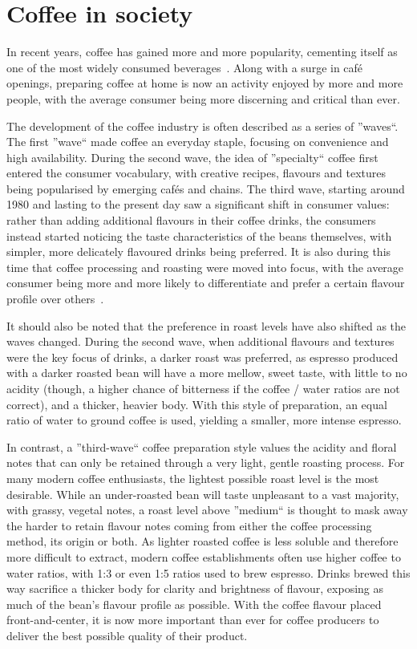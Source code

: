 \section{Coffee in society}
\label{sec:coffee-in-society} In recent years, coffee has gained more and more popularity,
cementing itself as one of the most widely consumed beverages~\cite{coffeeConsumptionStats}.
Along with a surge
in café openings, preparing coffee at home is now an activity enjoyed by more
and more people, with the average consumer being more discerning and critical than
ever.

The development of the coffee industry is often described as a series of ''waves``.
The first ''wave`` made coffee an everyday staple, focusing on convenience and high
availability.
During the second wave, the idea of ''specialty`` coffee first entered
the consumer vocabulary, with creative recipes, flavours and textures being popularised
by emerging cafés and chains.
The third wave, starting around 1980 and lasting to
the present day saw a significant shift in consumer values: rather than adding
additional flavours in their coffee drinks, the consumers instead started noticing
the taste characteristics of the beans themselves, with simpler, more delicately
flavoured drinks being preferred.
It is also during this time that coffee
processing and roasting were moved into focus, with the average consumer being more
and more likely to differentiate and prefer a certain flavour profile over others~\cite{coffeeWaves}.

It should also be noted that the preference in roast levels have also shifted as
the waves changed.
During the second wave, when additional flavours and textures
were the key focus of drinks, a darker roast was preferred, as espresso produced
with a darker roasted bean will have a more mellow, sweet taste, with little to no
acidity (though, a higher chance of bitterness if the coffee / water ratios are not
correct), and a thicker, heavier body.
With this style of preparation, an equal
ratio of water to ground coffee is used, yielding a smaller, more intense
espresso.

In contrast, a ''third-wave`` coffee preparation style values the acidity and floral
notes that can only be retained through a very light, gentle roasting process.
For
many modern coffee enthusiasts, the lightest possible roast level is the most
desirable.
While an under-roasted bean will taste unpleasant to a vast majority,
with grassy, vegetal notes, a roast level above ''medium`` is thought to mask
away the harder to retain flavour notes coming from either the coffee processing
method, its origin or both.
As lighter roasted coffee is less soluble and
therefore more difficult to extract, modern coffee establishments often use higher
coffee to water ratios, with 1:3 or even 1:5 ratios used to brew espresso.
Drinks
brewed this way sacrifice a thicker body for clarity and brightness of flavour,
exposing as much of the bean's flavour profile as possible.
With the coffee flavour
placed front-and-center, it is now more important than ever for coffee producers
to deliver the best possible quality of their product.


